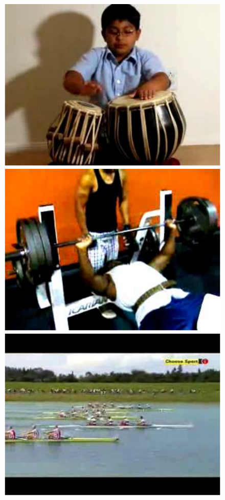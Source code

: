 \begin{figure}[!t]
\begin{center}
\includegraphics[scale=0.25]{cvpr14_figures/dataset_thumb/ucf/crop_class4.pdf} 
\includegraphics[scale=0.25]{cvpr14_figures/dataset_thumb/ucf/crop_class5.pdf} 
\includegraphics[scale=0.25]{cvpr14_figures/dataset_thumb/ucf/crop_class6.pdf} \\

\end{center}
\end{figure}
